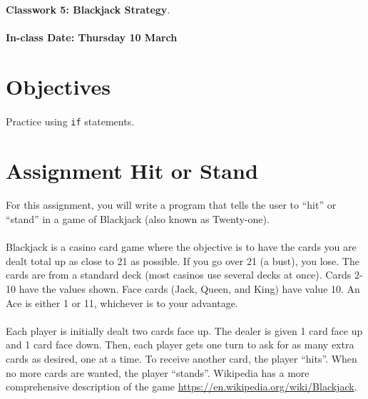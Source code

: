\documentclass[letter,11pt]{article}
\begin{document}
\huge
\textbf{Classwork 5: Blackjack Strategy}.
\normalsize
\\ ~~ \\
\textbf{In-class Date: Thursday 10 March}

\section*{Objectives}
\paragraph{}Practice using \texttt{if} statements.

\section*{Assignment Hit or Stand}
\paragraph{}For this assignment, you will write a program that tells the user to ``hit'' or ``stand'' in a game of Blackjack (also known as Twenty-one).
\paragraph{}Blackjack is a casino card game where the objective is to have the cards you are dealt total up as close to 21 as possible. If you go over 21 (a bust), you lose. The cards are from a standard deck (most casinos use several decks at once). Cards 2-10 have the values shown. Face cards (Jack, Queen, and King) have value 10. An Ace is either 1 or 11, whichever is to your advantage.
\paragraph{}Each player is initially dealt two cards face up. The dealer is given 1 card face up and 1 card face down. Then, each player gets one turn to ask for as many extra cards as desired, one at a time. To receive another card, the player ``hits''. When no more cards are wanted, the player ``stands''. Wikipedia has a more comprehensive description of the game \url{https://en.wikipedia.org/wiki/Blackjack}.
\end{document}
